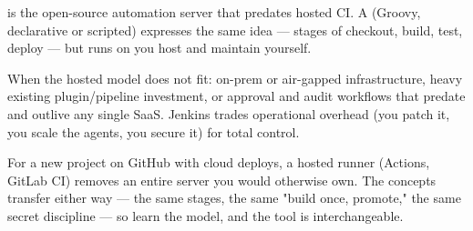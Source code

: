   is the open-source automation server that predates hosted CI. A  (Groovy, declarative or scripted) expresses the same idea --- stages of checkout, build, test, deploy --- but runs on  you host and maintain yourself.


 When the hosted model does not fit: on-prem or air-gapped infrastructure, heavy existing plugin/pipeline investment, or approval and audit workflows that predate and outlive any single SaaS. Jenkins trades operational overhead (you patch it, you scale the agents, you secure it) for total control.

 For a new project on GitHub with cloud deploys, a hosted runner (Actions, GitLab CI) removes an entire server you would otherwise own. The concepts transfer either way --- the same stages, the same "build once, promote," the same secret discipline --- so learn the model, and the tool is interchangeable.

